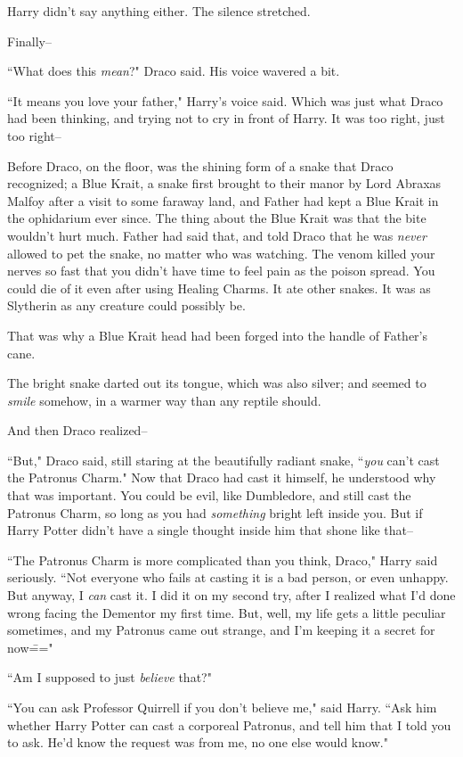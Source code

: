 Harry didn't say anything either. The silence stretched.

Finally\---

``What does this \emph{mean}?" Draco said. His voice wavered a bit.

``It means you love your father," Harry's voice said. Which was just what Draco had been thinking, and trying not to cry in front of Harry. It was too right, just too right\---

Before Draco, on the floor, was the shining form of a snake that Draco recognized; a Blue Krait, a snake first brought to their manor by Lord Abraxas Malfoy after a visit to some faraway land, and Father had kept a Blue Krait in the ophidarium ever since. The thing about the Blue Krait was that the bite wouldn't hurt much. Father had said that, and told Draco that he was \emph{never} allowed to pet the snake, no matter who was watching. The venom killed your nerves so fast that you didn't have time to feel pain as the poison spread. You could die of it even after using Healing Charms. It ate other snakes. It was as Slytherin as any creature could possibly be.

That was why a Blue Krait head had been forged into the handle of Father's cane.

The bright snake darted out its tongue, which was also silver; and seemed to \emph{smile} somehow, in a warmer way than any reptile should.

And then Draco realized\---

``But," Draco said, still staring at the beautifully radiant snake, ``\emph{you} can't cast the Patronus Charm." Now that Draco had cast it himself, he understood why that was important. You could be evil, like Dumbledore, and still cast the Patronus Charm, so long as you had \emph{something} bright left inside you. But if Harry Potter didn't have a single thought inside him that shone like that\---

``The Patronus Charm is more complicated than you think, Draco," Harry said seriously. ``Not everyone who fails at casting it is a bad person, or even unhappy. But anyway, I \emph{can} cast it. I did it on my second try, after I realized what I'd done wrong facing the Dementor my first time. But, well, my life gets a little peculiar sometimes, and my Patronus came out strange, and I'm keeping it a secret for now\==="

``Am I supposed to just \emph{believe} that?"

``You can ask Professor Quirrell if you don't believe me," said Harry. ``Ask him whether Harry Potter can cast a corporeal Patronus, and tell him that I told you to ask. He'd know the request was from me, no one else would know."

